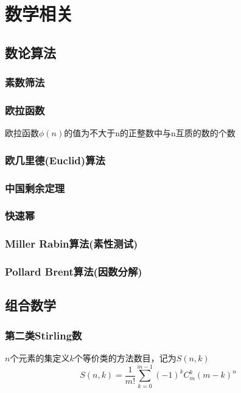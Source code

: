 
\section{数学相关}

\subsection{数论算法}
\subsubsection{素数筛法}
\subsubsection{欧拉函数}
欧拉函数$\phi(n)$的值为不大于n的正整数中与n互质的数的个数
\subsubsection{欧几里德(Euclid)算法}
\subsubsection{中国剩余定理}
\subsubsection{快速幂}
\subsubsection{Miller Rabin算法(素性测试)}
\subsubsection{Pollard Brent算法(因数分解)}

\subsection{组合数学}
\subsubsection{第二类Stirling数}
$n$个元素的集定义$k$个等价类的方法数目，记为$S(n,k)$
\begin{displaymath}
S(n, k) = \frac{1}{m!}\sum_{k=0}^{m-1}{(-1)^k C_m^k (m-k)^n}
\end{displaymath}

